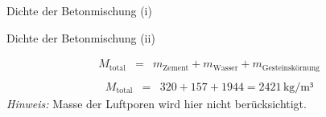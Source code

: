 \begin{frame}{Dichte der Betonmischung (i)}
    \begin{table}[h]
        \centering
        \caption{Aufgabe zur Stoffraumberechnung}
        \small
    \label{tab:Stoffraumberechnung}
        \end{table}

\end{frame}

\begin{frame}{Dichte der Betonmischung (ii)}

    \begin{eqnarray*}
        M_{\text{total}} &=& m_{\text{Zement}} + m_{\text{Wasser}} + m_{\text{Gesteinskörnung}} \\
    \end{eqnarray*}
    \pause
    \begin{eqnarray*}
        M_{\text{total}} &=& 320 + 157 + 1944 = 2421 \, \text{kg/m³}
    \end{eqnarray*}
    \pause
    \textit{Hinweis:} Masse der Luftporen wird hier nicht berücksichtigt.


\end{frame}

